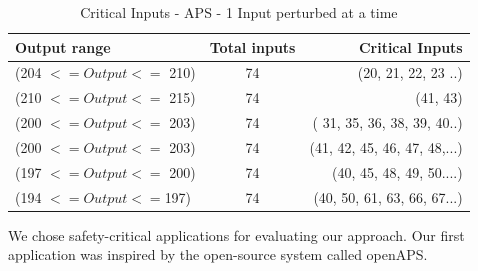 \begin{table}[h!]
	\begin{center}
		\caption{Critical Inputs - APS - 1 Input perturbed at a time}
		\label{tab:table1}
		\begin{tabular}{l|S|r}
			\textbf{Output range} & \textbf{Total inputs} & \textbf{Critical Inputs}  \\
			\hline
			(204 $<= Output <=$ 210) &  74&  (20, 21, 22, 23 ..)\\
			(210 $<= Output <=$ 215) &  74&   (41, 43)\\
			(200 $<= Output <=$ 203) &  74&  ( 31, 35, 36, 38, 39, 40..) \\
			(200 $<= Output <=$ 203) &  74&  (41, 42, 45, 46, 47, 48,...) \\
			(197 $<= Output <=$ 200) &  74&  (40, 45, 48, 49, 50....) \\
			(194 $<= Output <=$197) & 74& (40, 50, 61, 63, 66, 67...)\\
			\hline
			\hline
			
		\end{tabular}
	\end{center}
\end{table}
We chose safety-critical applications for evaluating our approach. Our first application was inspired by the open-source system called openAPS.

